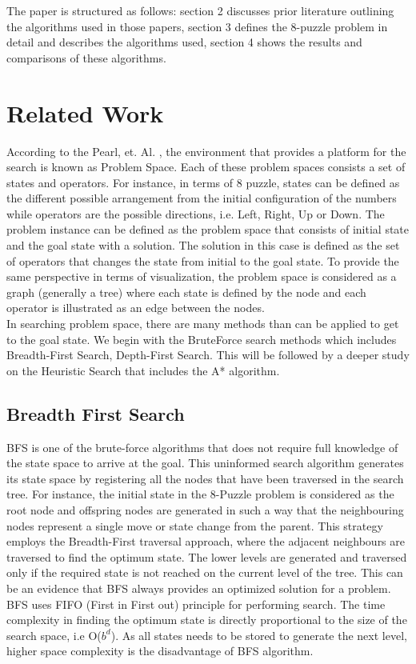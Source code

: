 \documentclass{svproc}
\begin{document}
\noindent The paper is structured as follows: section 2 discusses prior literature outlining the algorithms used in those papers,  section 3 defines the 8-puzzle problem in detail and describes the algorithms used, section 4 shows the results and comparisons of these algorithms.

\section{Related Work}
\noindent According to the Pearl, et. Al. , the environment that provides a platform for the search is known as Problem Space. Each of these problem spaces consists a set of states and operators. For instance, in terms of 8 puzzle, states can be defined as the different possible arrangement from the initial configuration of the numbers while operators are the possible directions, i.e. Left, Right, Up or Down. The problem instance can be defined as the problem space that consists of initial state and the goal state with a solution. The solution in this case is defined as the set of operators that changes the state from initial to the goal state. To provide the same perspective in terms of visualization, the problem space is considered as a graph (generally a tree) where each state is defined by the node and each operator is illustrated as an edge between the nodes. \\

\noindent In searching problem space, there are many methods than can be applied to get to the goal state. We begin with the BruteForce search methods which includes Breadth-First Search, Depth-First Search. This will be followed by a deeper study on the Heuristic Search that includes the A* algorithm.

\subsection{Breadth First Search}
\noindent BFS is one of the brute-force algorithms that does not require full knowledge of the state space to arrive at the goal. This uninformed search algorithm generates its state space by registering all the nodes that have been traversed in the search tree. For instance, the initial state in the 8-Puzzle problem is considered as the root node and offspring nodes are generated in such a way that the neighbouring nodes represent a single move or state change from the parent. This strategy employs the Breadth-First traversal approach, where the adjacent neighbours are traversed to find the optimum state. The lower levels are generated and traversed only if the required state is not reached on the current level of the tree. This can be an evidence that BFS always provides an optimized solution for a problem. BFS uses FIFO (First in First out) principle for performing search. The time complexity in finding the optimum state is directly proportional to the size of the search space, i.e O($b^{d}$). As all states needs to be stored to generate the next level, higher space complexity is the disadvantage of BFS algorithm.
\end{document}
